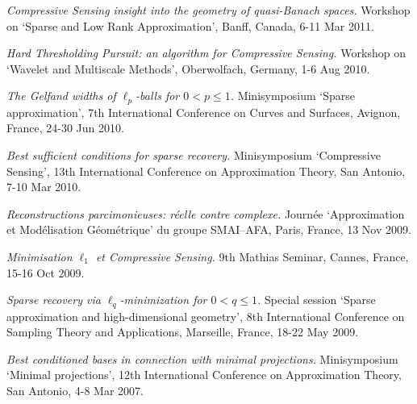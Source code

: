 \documentclass[11pt]{article}
\begin{document}
\item {\sl Compressive Sensing insight into the geometry of quasi-Banach spaces.}
Workshop on `Sparse and Low Rank Approximation', Banff, Canada, 6-11 Mar 2011.
\item {\sl Hard Thresholding Pursuit: an algorithm for Compressive Sensing.}
Workshop on `Wavelet and \mbox{Multiscale} Methods', Oberwolfach, Germany, 1-6 Aug 2010.
\item {\sl The Gelfand widths of $\ell_p$-balls for $0<p\leq 1$.}
Minisymposium `Sparse approximation', 7th \mbox{International} Conference on Curves and Surfaces, Avignon, France, 24-30 Jun 2010.
\item {\sl Best sufficient conditions for sparse recovery.}
Minisymposium `Compressive Sensing', 13th \mbox{International} Conference on Approximation Theory, San Antonio, 7-10 Mar  2010.
\item {\sl Reconstructions parcimonieuses: r\'eelle contre complexe.} Journ\'ee `Approximation et Mod\'elisation G\'eom\'etrique' du groupe SMAI--AFA,
Paris, France, 13 Nov 2009.
\item {\sl Minimisation $\ell_1$ et Compressive Sensing.} 9th Mathias Seminar, Cannes, France, 15-16 Oct 2009.
\item {\sl Sparse recovery via $\ell_q$-minimization for $0<q \le 1$.} 
Special session `Sparse approximation and high-dimensional geometry',
8th International Conference on Sampling Theory and Applications, Marseille, France, 18-22 May 2009.
\item {\sl Best conditioned bases in connection with minimal projections.}
Minisymposium `Minimal projections', 12th International Conference on Approximation Theory, San Antonio, 4-8 Mar 2007.
\eitemize
\end{document}
